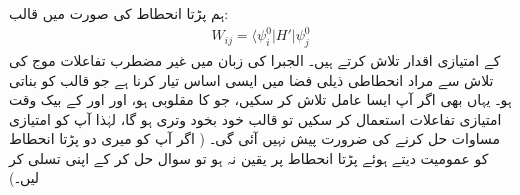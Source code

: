  ہم  پڑتا انحطاط کی صورت میں  قالب:
\begin{align}
W_{i j} = \langle \psi_i^0 | H' | \psi_j^0
\end{align}
کے امتیازی اقدار تلاش کرتے ہیں۔ الجبرا کی زبان میں  غیر مضطرب تفاعلات موج کی تلاش سے مراد انحطاطی ذيلی فضا میں ایسی اساس تیار کرنا ہے جو قالب  کو  بناتی ہو۔ یہاں بھی اگر آپ ایسا عامل  تلاش کر سکیں، جو  کا مقلوبی ہو، اور  اور  کے بیک وقت امتیازی تفاعلات استعمال کر سکیں تو قالب  خود بخود وتری ہو گا، لہٰذا آپ کو امتیازی مساوات حل کرنے کی ضرورت پیش نہیں آئی گی۔ ( اگر آپ کو میری دو پڑتا انحطاط کو عمومیت دیتے ہوئے  پڑتا انحطاط پر یقین نہ ہو تو سوال  حل کر کے اپنی تسلی کر لیں۔)

